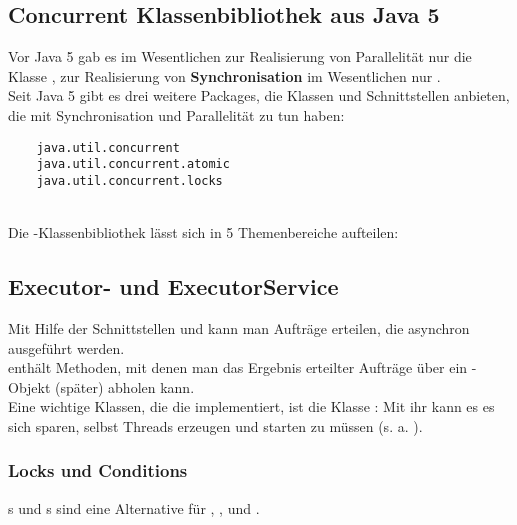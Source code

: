 \subsection{Concurrent Klassenbibliothek aus Java 5}

Vor Java 5 gab es im Wesentlichen zur Realisierung von Parallelität nur die Klasse , zur Realisierung von \textbf{Synchronisation} im Wesentlichen nur .\\

\noindent
Seit Java 5 gibt es drei weitere Packages, die Klassen und Schnittstellen anbieten, die mit Synchronisation und Parallelität zu tun haben:



\begin{verbatim}
    java.util.concurrent
    java.util.concurrent.atomic
    java.util.concurrent.locks
\end{verbatim}\\

\noindent
Die -Klassenbibliothek lässt sich in 5 Themenbereiche aufteilen:

\subsection*{Executor- und ExecutorService}
Mit Hilfe der Schnittstellen  und  kann man Aufträge erteilen, die asynchron ausgeführt werden.\\

\noindent
{} enthält Methoden, mit denen man das Ergebnis erteilter Aufträge über ein -Objekt (später) abholen kann.\\

\noindent
Eine wichtige Klassen, die die  implementiert, ist die Klasse : Mit ihr kann es es sich sparen, selbst Threads erzeugen und starten zu müssen (s. a. \cite[146]{Oec22}).\\

\subsubsection{Locks und Conditions}
s und s sind eine Alternative für , , und .\\

